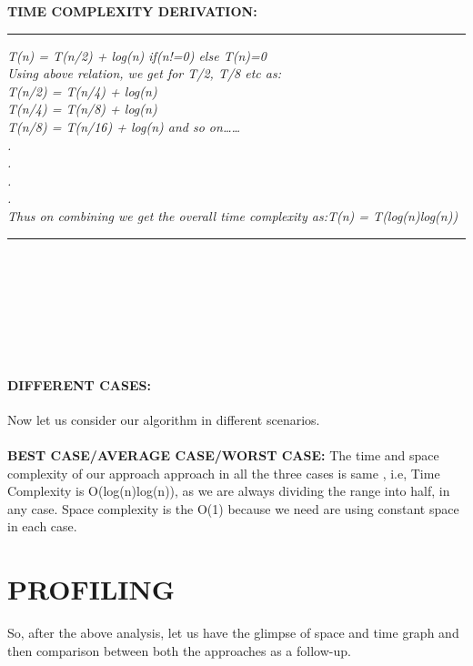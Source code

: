 \documentclass[10pt]{article}
\begin{document}
\begin{multicols*}{2}
\textbf{TIME COMPLEXITY DERIVATION:}
\rule{9cm}{1pt}
\textit{
T(n) = T(n/2) + log(n) if(n!=0) else T(n)=0\\
Using above relation, we get for T/2, T/8 etc as:\\
T(n/2) = T(n/4) + log(n)\\
T(n/4) = T(n/8) + log(n)\\
T(n/8) = T(n/16) + log(n) and so on……\\
.\\
.\\
.\\
.\\
Thus on combining we get the overall time 
complexity as:T(n) = T(log(n)log(n))\\}
\rule{9cm}{1pt}\\\\\\\\\\\\\paragraph{DIFFERENT CASES:} Now let us consider our algorithm in different 
scenarios.\\\\\textbf{BEST CASE/AVERAGE CASE/WORST CASE:} The time and space complexity of our approach approach in all the three cases is same , i.e, Time Complexity is  O(log(n)log(n)), as we are always dividing the range into half, in any case. Space complexity is the O(1) because we need are using constant space in each case.

\section*{PROFILING}

So, after the above analysis, let us have the glimpse of space and time graph and then comparison between both the approaches as a follow-up.


\end{multicols*}
\end{document}
